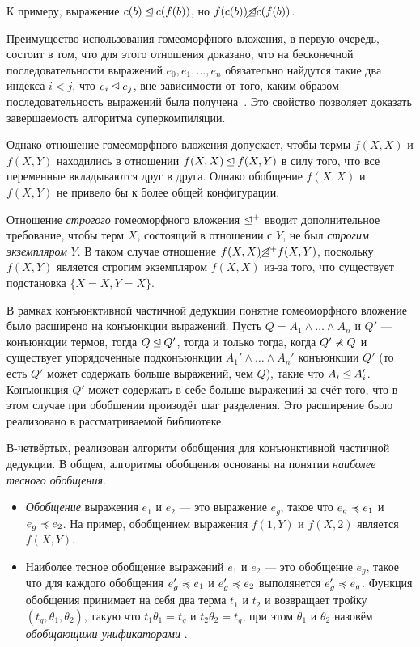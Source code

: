 К примеру, выражение $c(b) \unlhd c(f(b))$, но $f(c(b)) \cancel{\unlhd} c(f(b))$.

Преимущество использования гомеоморфного вложения, в первую очередь, состоит в том,
что для этого отношения доказано, что на бесконечной последовательности выражений $e_0, e_1, \dots, e_n$
обязательно найдутся такие два индекса $i < j$, что $e_i \unlhd e_j$, вне зависимости
от того, каким образом последовательность выражений была получена~\cite{scPos}.
Это свойство позволяет доказать завершаемость алгоритма суперкомпиляции.

Однако отношение гомеоморфного вложения допускает, чтобы термы $f(X, X)$ и $f(X, Y)$
находились в отношении  $f(X, X) \unlhd f(X, Y)$ в силу того,
что все переменные вкладываются друг в друга. Однако обобщение
$f(X, X)$ и $f(X, Y)$ не привело бы к более общей конфигурации.

Отношение \emph{строгого} гомеоморфного вложения $\unlhd^+$ вводит дополнительное
требование, чтобы терм $X$, состоящий в отношении с $Y$, не был \emph{строгим экземпляром} $Y$\cite{homeo}.
В таком случае отношение $f(X, X) \cancel{\unlhd}^+ f(X, Y)$, поскольку $f(X, Y)$ является строгим
экземпляром $f(X, X)$ из-за того, что существует подстановка $\{ X = X, Y = X \}$.

В рамках конъюнктивной частичной дедукции понятие гомеоморфного вложение было расширено на конъюнкции выражений.
Пусть $Q = A_1 \land \dots \land A_n$ и $Q'$ --- конъюнкции термов, тогда $Q \unlhd Q'$, тогда и только тогда,
когда $Q' \not\prec Q$ и существует упорядоченные подконъюнкции $A_1' \land \dots \land A_n'$
конъюнкции $Q'$ (то есть $Q'$ может содержать больше выражений, чем $Q$), такие что $A_i \unlhd A_i'$\cite{cpd}.
Конъюнкция $Q'$ может содержать в себе больше выражений за счёт того, что в этом случае при обобщении
произодёт шаг разделения. Это расширение было реализовано в рассматриваемой библиотеке.



В-четвёртых, реализован алгоритм обобщения для конъюнктивной частичной дедукции.
В общем, алгоритмы обобщения основаны на понятии \emph{наиболее тесного обобщения}.
\begin{itemize}
\item \emph{Обобщение} выражения $e_1$ и $e_2$ --- это выражение $e_g$, такое что
$e_g \preccurlyeq e_1$  и $e_g \preccurlyeq e_2$. На пример, обобщением выражения
$f(1, Y)$ и $f(X, 2)$ является $f(X, Y)$.
\item Наиболее тесное обобщение 
выражений $e_1$ и $e_2$ --- это обобщение $e_g$, такое что
для каждого обобщения $e_g' \preccurlyeq e_1$ и $e_g' \preccurlyeq e_2$ выполянется $e_g' \preccurlyeq e_g$\cite{scPos}.
Функция обобщения принимает на себя два терма $t_1$ и $t_2$ и возвращает
тройку $(t_g, \theta_1, \theta_2)$, такую что $t_1 \theta_1 = t_g$ и $t_2 \theta_2 = t_g$,
при этом $\theta_1$ и $\theta_2$ назовём \emph{обобщающими унификаторами} .
\end{itemize}


